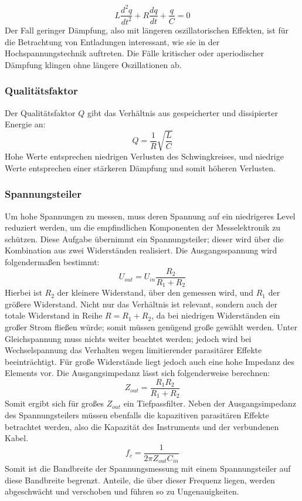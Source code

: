 \begin{equation}
L\frac{d^2q}{dt^2} + R\frac{dq}{dt} + \frac{q}{C} = 0
\end{equation}
Der Fall geringer Dämpfung, also mit längeren oszillatorischen Effekten, ist für die Betrachtung von Entladungen interessant, wie sie in der Hochspannungstechnik auftreten. Die Fälle kritischer oder aperiodischer Dämpfung klingen ohne längere Oszillationen ab.
\subsubsection{Qualitätsfaktor}
Der Qualitätsfaktor \(Q\) gibt das Verhältnis aus gespeicherter und dissipierter Energie an:
\begin{equation}
Q = \frac{1}{R} \sqrt{\frac{L}{C}}
\end{equation}
Hohe Werte entsprechen niedrigen Verlusten des Schwingkreises, und niedrige Werte entsprechen einer stärkeren Dämpfung und somit höheren Verlusten.

\subsubsection{Spannungsteiler}
\label{sec:voltagedividertheo}
Um hohe Spannungen zu messen, muss deren Spannung auf ein niedrigeres Level reduziert werden, um die empfindlichen Komponenten der Messelektronik zu schützen. Diese Aufgabe übernimmt ein Spannungsteiler; dieser wird über die Kombination aus zwei Widerständen realisiert. Die Ausgangsspannung wird folgendermaßen bestimmt:
\begin{equation}
    U_{out} = U_{in} \frac{R_2}{R_1 + R_2}
    \label{eq:voltagedivider}
\end{equation}
Hierbei ist \(R_2\) der kleinere Widerstand, über den gemessen wird, und \(R_1\) der größere Widerstand. Nicht nur das Verhältnis ist relevant, sondern auch der totale Widerstand in Reihe \(R = R_1 + R_2\), da bei niedrigen Widerständen ein großer Strom fließen würde; somit müssen genügend große gewählt werden. Unter Gleichspannung muss nichts weiter beachtet werden; jedoch wird bei Wechselspannung das Verhalten wegen limitierender parasitärer Effekte beeinträchtigt. Für große Widerstände liegt jedoch auch eine hohe Impedanz des Elements vor. Die Ausgangsimpedanz lässt sich folgenderweise berechnen:
\begin{equation}
    Z_{out} = \frac{R_1 R_2}{R_1 + R_2}
    \label{eq:voltagedividerimp}
\end{equation}
Somit ergibt sich für großes \(Z_{out}\) ein Tiefpassfilter. Neben der Ausgangsimpedanz des Spannungsteilers müssen ebenfalls die kapazitiven parasitären Effekte betrachtet werden, also die Kapazität des Instruments und der verbundenen Kabel.
\begin{equation}
  f_c = \frac{1}{2\pi Z_{out} C_{in}}
    \label{eq:voltagedividerfreq}
\end{equation}
Somit ist die Bandbreite der Spannungsmessung mit einem Spannungsteiler auf diese Bandbreite begrenzt. Anteile, die über dieser Frequenz liegen, werden abgeschwächt und verschoben und führen so zu Ungenauigkeiten. 

